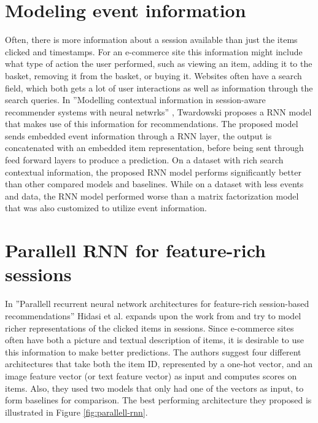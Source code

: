 \section{Modeling event information}
Often, there is more information about a session available than just the items clicked and timestamps. For an e-commerce site this information might include what type of action the user performed, such as viewing an item, adding it to the basket, removing it from the basket, or buying it. Websites often have a search field, which both gets a lot of user interactions as well as information through the search queries. In ''Modelling contextual information in session-aware recommender systems with neural netwrks'' \cite{Twardowski:2016:MCI:2959100.2959162}, Twardowski proposes a RNN model that makes use of this information for recommendations. The proposed model sends embedded event information through a RNN layer, the output is concatenated with an embedded item representation, before being sent through feed forward layers to produce a prediction. On a dataset with rich search contextual information, the proposed RNN model performs significantly better than other compared models and baselines. While on a dataset with less events and data, the RNN model performed worse than a matrix factorization model that was also customized to utilize event information.


\section{Parallell RNN for feature-rich sessions}
In ''Parallell recurrent neural network architectures for feature-rich session-based recommendations'' \cite{Hidasi:2016:PRN:2959100.2959167} Hidasi et al. expands upon the work from \cite{DBLP:journals/corr/HidasiKBT15} and try to model richer representations of the clicked items in sessions. Since e-commerce sites often have both a picture and textual description of items, it is desirable to use this information to make better predictions. The authors suggest four different architectures that take both the item ID, represented by a one-hot vector, and an image feature vector (or text feature vector) as input and computes scores on items. Also, they used two models that only had one of the vectors as input, to form baselines for comparison. The best performing architecture they proposed is illustrated in Figure \ref{fig:parallell-rnn}.

